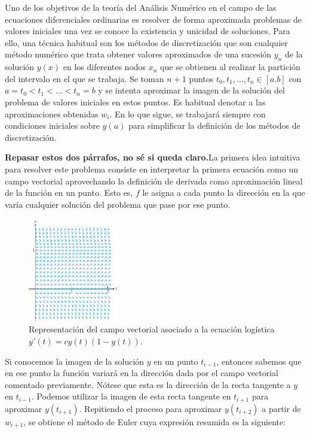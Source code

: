\documentclass{article}
\theoremstyle{theorem-style}  %
\theoremstyle{definition}
\theoremstyle{example-style}
\begin{document}
	Uno de los objetivos de la teoría del Análisis Numérico en el campo de las ecuaciones diferenciales ordinarias es resolver de forma aproximada problemas de valores iniciales una vez se conoce la existencia y unicidad de soluciones. Para ello, una técnica habitual son los métodos de discretización que son cualquier método numérico que trata obtener valores aproximados de una sucesión $y_n$ de la solución $y(x)$ en los diferentes nodos $x_n$ que se obtienen al realizar la partición del intervalo en el que se trabaja. Se toman $n+1$ puntos $t_0, t_1, \ldots, t_n \in [a.b]$ con $a = t_0 < t_1 < \ldots < t_n = b$ y se intenta aproximar la imagen de la solución del problema de valores iniciales en estos puntos. Es habitual denotar a las aproximaciones obtenidas $w_i$. En lo que sigue, se trabajará siempre con condiciones iniciales sobre $y(a)$ para simplificar la definición de los métodos de discretización. 	
	
	\textbf{Repasar estos dos párrafos, no sé si queda claro.}La primera idea intuitiva para resolver este problema consiste en interpretar la primera ecuación como un campo vectorial aprovechando la definición de derivada como aproximación lineal de la función en un punto. Esto es, $f$ le asigna a cada punto la dirección en la que varía cualquier solución del problema que pase por ese punto.

	\begin{figure}[h]
		\centering
		\includegraphics[width=4cm]{./Images/interpret-pvi.png}
		\caption{Representación del campo vectorial asociado a la ecuación logística $y'(t) = c y(t) (1 - y(t))$.} 
		\label{fig:interpret-pvi}
	\end{figure}

	Si conocemos la imagen de la solución $y$ en un punto $t_{i-1}$, entonces sabemos que en ese punto la función variará en la dirección dada por el campo vectorial comentado previamente. Nótese que esta es la dirección de la recta tangente a $y$ en $t_{i-1}$. Podemos utilizar la imagen de esta recta tangente en $t_{i+1}$ para aproximar $y(t_{i+1})$. Repitiendo el proceso para aproximar $y(t_{i+2})$ a partir de $w_{i+1}$, se obtiene el método de Euler cuya expresión resumida es la siguiente:
\end{document}
